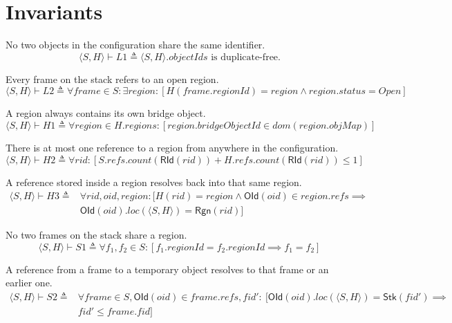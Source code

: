 \documentclass[acmsmall,nonacm,screen]{acmart}
\newcommand{\inN}{\!\in\!}
\begin{document}
\section{Invariants}
\label{sec:invariants}

\begin{definition}[L1]
No two objects in the configuration share the same identifier.
\[\langle S, H \rangle \vdash L1 \triangleq \langle S, H \rangle.objectIds \text{ is duplicate-free.}\]
\end{definition}

\begin{definition}[L2]
Every frame on the stack refers to an open region.
\[\langle S, H \rangle \vdash L2 \triangleq \forall frame \inN S : \exists region : [H(frame.regionId) = region \wedge region.status = Open]\]
\end{definition}

\begin{definition}[H1]
A region always contains its own bridge object.
\[\langle S, H \rangle \vdash H1 \triangleq \forall region \inN H.regions : [region.bridgeObjectId \inN dom(region.objMap)]\]
\end{definition}

\begin{definition}[H2]
There is at most one reference to a region from anywhere in the configuration.
\[\langle S, H \rangle \vdash H2 \triangleq \forall rid : [S.refs.count(\mathsf{RId}(rid)) + H.refs.count(\mathsf{RId}(rid)) \le 1]\]
\end{definition}

\begin{definition}[H3]
A reference stored inside a region resolves back into that same region.
\begin{align*}
  \langle S, H \rangle \vdash H3 \triangleq{} & \forall rid, oid, region : [H(rid) = region \wedge \mathsf{OId}(oid) \inN region.refs \implies{} \\
  & \mathsf{OId}(oid).loc(\langle S, H \rangle) = \mathsf{Rgn}(rid)]
\end{align*}
\end{definition}

\begin{definition}[S1]
No two frames on the stack share a region.
\[\langle S, H \rangle \vdash S1 \triangleq \forall f_1, f_2 \inN S : [f_1.regionId = f_2.regionId \implies f_1 = f_2]\]
\end{definition}

\begin{definition}[S2]
A reference from a frame to a temporary object resolves to that frame or an earlier one.
\begin{align*}
  \langle S, H \rangle \vdash S2 \triangleq{} & \forall frame \inN S, \mathsf{OId}(oid) \inN frame.refs, fid' :\ [\mathsf{OId}(oid).loc(\langle S, H \rangle) = \mathsf{Stk}(fid') \implies{} \\
  & fid' \le frame.fid]
\end{align*}
\end{definition}
\end{document}
